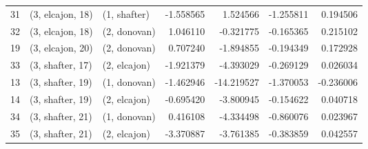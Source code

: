 \begin{tabular}{lllrrrr}
31 &  (3, elcajon, 18) &     (1, shafter) &  -1.558565 &   1.524566 &  -1.255811 &  0.194506 \\
32 &  (3, elcajon, 18) &     (2, donovan) &   1.046110 &  -0.321775 &  -0.165365 &  0.215102 \\
19 &  (3, elcajon, 20) &     (2, donovan) &   0.707240 &  -1.894855 &  -0.194349 &  0.172928 \\
33 &  (3, shafter, 17) &     (2, elcajon) &  -1.921379 &  -4.393029 &  -0.269129 &  0.026034 \\
13 &  (3, shafter, 19) &     (1, donovan) &  -1.462946 & -14.219527 &  -1.370053 & -0.236006 \\
14 &  (3, shafter, 19) &     (2, elcajon) &  -0.695420 &  -3.800945 &  -0.154622 &  0.040718 \\
34 &  (3, shafter, 21) &     (1, donovan) &   0.416108 &  -4.334498 &  -0.860076 &  0.023967 \\
35 &  (3, shafter, 21) &     (2, elcajon) &  -3.370887 &  -3.761385 &  -0.383859 &  0.042557 \\
\bottomrule
\end{tabular}
